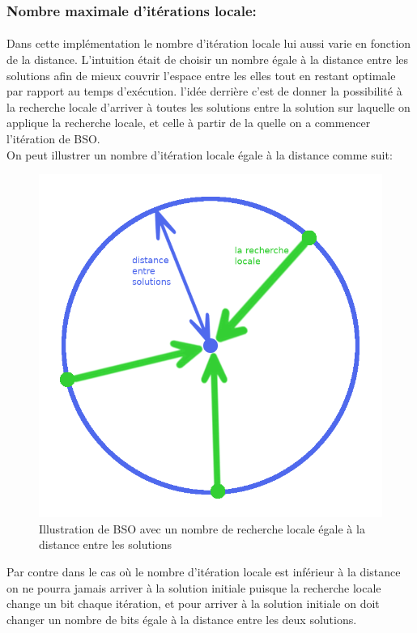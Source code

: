	\subsubsection{Nombre maximale d’itérations locale:}
	\paragraph{}
	Dans cette implémentation le nombre d’itération locale lui aussi varie en fonction de la distance. L’intuition était de choisir un nombre égale à la distance entre les solutions afin de mieux couvrir l’espace entre les elles tout en restant optimale par rapport au temps d’exécution. l’idée derrière c’est de donner la possibilité à la recherche locale d’arriver à toutes les solutions entre la solution sur laquelle on applique la recherche locale, et celle à partir de la quelle on a commencer l’itération de BSO.\\
	On peut illustrer un nombre d’itération locale égale à la distance comme suit:
	\begin{figure}[H]\label{localeSearch1}
		\centering
		\includegraphics[scale=0.35]{images/imgs/localeSearch2.png}
		\caption{Illustration de BSO avec un nombre de recherche locale égale à la distance entre les solutions}
	\end{figure}
	Par contre dans le cas où le nombre d’itération locale est inférieur à la distance on ne pourra jamais arriver à la solution initiale puisque la recherche locale change un bit chaque itération, et pour arriver à la solution initiale on doit changer un nombre de bits égale à la distance entre les deux solutions. 
